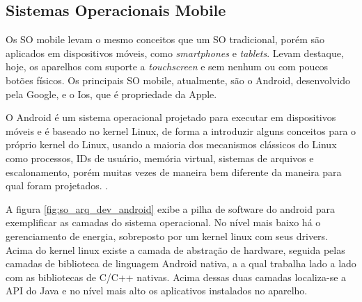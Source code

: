 \subsection{Sistemas Operacionais Mobile}

Os SO mobile levam o mesmo conceitos que um SO tradicional, porém são aplicados em dispositivos móveis, como \textit{smartphones} e \textit{tablets}. Levam destaque, hoje, os aparelhos com suporte a \textit{touchscreen} e sem nenhum ou com poucos botões físicos. Os principais SO mobile, atualmente, são o Android, desenvolvido pela Google, e o Ios, que é propriedade da Apple. 

O Android é um sistema operacional projetado para executar em dispositivos móveis e é baseado no kernel Linux, de forma a introduzir alguns conceitos para o próprio kernel do Linux, usando a maioria dos mecanismos clássicos do Linux como processos, IDs de usuário, memória virtual, sistemas de arquivos e escalonamento, porém muitas vezes de maneira bem diferente da maneira para qual foram projetados. \citep{so_tanembaum}. 

A figura \ref{fig:so_arq_dev_android} exibe a pilha de software do android para exemplificar as camadas do sistema operacional. No nível mais baixo há o gerenciamento de energia, sobreposto por um kernel linux com seus drivers. Acima do kernel linux existe a camada de abstração de hardware, seguida pelas camadas de biblioteca de linguagem Android nativa, a a qual trabalha lado a lado com as bibliotecas de C/C++ nativas. Acima dessas duas camadas localiza-se a API do Java e no nível mais alto os aplicativos instalados no aparelho.

